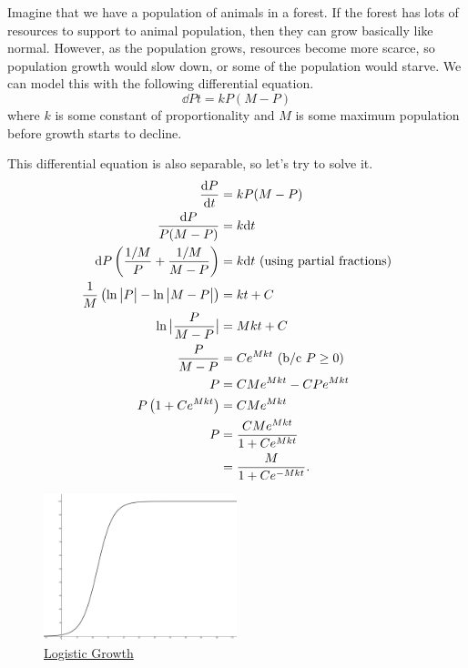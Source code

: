 \begin{example}
	Imagine that we have a population of animals in a forest.
	If the forest has lots of resources to support to animal population, then they can grow basically like normal.
	However, as the population grows, resources become more scarce, so population growth would slow down, or some of the population would starve.
	We can model this with the following differential equation.
	\begin{equation*}
		\dd{P}{t} = kP(M-P)
	\end{equation*}
	where $k$ is some constant of proportionality and $M$ is some maximum population before growth starts to decline.
\end{example}
\begin{answer}
	This differential equation is also separable, so let's try to solve it.
	\begin{align*}
		\frac{\mathrm{d} P}{\mathrm{d} t} &= kP(M-P) \\
		\frac{\mathrm{d} P}{P(M-P)} &= k\mathrm{d} t \\
		\mathrm{d} P\left(\frac{1/M}{P}+\frac{1/M}{M-P}\right) &= k\mathrm{d} t \text{ (using partial fractions)} \\
		\frac{1}{M}\left(\ln{\big\lvert P \big\rvert} - \ln{\big\lvert M-P \big\rvert}\right) &= kt + C \\
		\ln{\big\lvert \frac{P}{M-P} \big\rvert} &= Mkt + C \\
		\frac{P}{M-P} &= Ce^{Mkt} \text{ (b/c $P \geq 0$)} \\
		P &= CMe^{Mkt} - CPe^{Mkt} \\
		P\left(1+Ce^{Mkt}\right) &= CMe^{Mkt} \\
		P &= \frac{CMe^{Mkt}}{1+Ce^{Mkt}} \\
		&= \frac{M}{1+Ce^{-Mkt}}.
	\end{align*}
\end{answer}

\begin{figure}[H]
	\label{logistic}
	\centering
	\includegraphics[width=0.5\textwidth]{./applications_integrals/logistic_growth.png}
	\caption{\hyperref{}{}{}{Logistic Growth}}
\end{figure}

